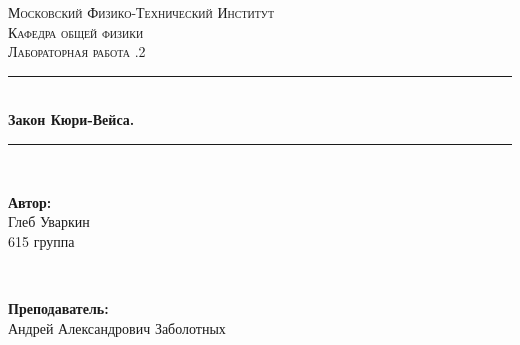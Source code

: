 \documentclass[a4paper, 12pt, twoside]{article}
\begin{document}
\begin{titlepage}

\newcommand{\HRule}{\rule{\linewidth}{0.7mm}} %

\center %
 

\textsc{\LARGE Московский Физико-Технический Институт}\\[1,5cm] %
\textsc{\Large Кафедра общей физики}\\[0.5cm] %
\textsc{\large Лабораторная работа .2}\\[0.5cm] %


\HRule
\\[0.4cm]
{ \huge \bfseries Закон Кюри-Вейса.}
\\[0.2cm] %
\HRule
\\[1.5cm]


 

\begin{minipage}{0.4\textwidth}
	\begin{flushleft} \large
		\textbf{Автор:}\\
		Глеб Уваркин \\
		615 группа
	\end{flushleft}
\end{minipage}
~
\begin{minipage}{0.4\textwidth}
	\begin{flushright} \large
		\textbf {Преподаватель:} \\
		Андрей Александрович Заболотных %
	\end{flushright}
\end{minipage}


\end{titlepage}
\end{document}
